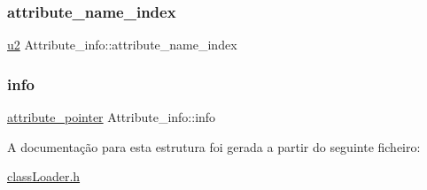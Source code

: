 \subsubsection{\texorpdfstring{attribute\+\_\+name\+\_\+index}{attribute\_name\_index}}
{\footnotesize\ttfamily \hyperlink{util_8h_a55ef8d87fd202b8417704c089899c5b9}{u2} Attribute\+\_\+info\+::attribute\+\_\+name\+\_\+index}

\mbox{\label{struct_attribute__info_af50e221b11ed1b84edbee3a06940b8eb}} 
\subsubsection{\texorpdfstring{info}{info}}
{\footnotesize\ttfamily \hyperlink{unionattribute__pointer}{attribute\+\_\+pointer} Attribute\+\_\+info\+::info}



A documentação para esta estrutura foi gerada a partir do seguinte ficheiro\+:\begin{DoxyCompactItemize}
\item 
\hyperlink{class_loader_8h}{class\+Loader.\+h}\end{DoxyCompactItemize}
